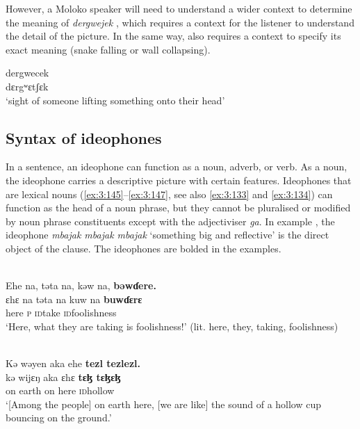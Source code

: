 However, a Moloko speaker will need to understand a wider context to determine the meaning of \textit{dergwejek} , which requires a context for the listener to understand the detail of the picture. In the same way,  also requires a context to specify its exact meaning (snake falling or wall collapsing).

\ea \label{ex:3:144}
\gll dergwecek\\
  dɛrgʷɛtʃɛk\\
\glt  ‘sight of someone lifting something onto their head’
\z

\subsection{Syntax of ideophones}\label{sec:3.6.2}
\hypertarget{RefHeading1211281525720847}{}
In a sentence, an ideophone can function as a noun, adverb, or verb. As a noun, the ideophone carries a descriptive picture with certain features.  Ideophones that are lexical nouns (\ref{ex:3:145}--\ref{ex:3:147}, see also \ref{ex:3:133} and \ref{ex:3:134}) can function as the head of a noun phrase, but they cannot be pluralised or modified by noun phrase constituents except with the adjectiviser \textit{ga}. In example , the ideophone \textit{mbajak mbajak mbajak} ‘something big and reflective’ is the direct object of the clause. The ideophones are bolded in the examples.

\ea \label{ex:3:145}\\
 Ehe na, təta na, kəw na, \textbf{bəwɗere.}\\
\gll      ɛhɛ  na      təta   na  kuw      na    \textbf{buwɗɛrɛ}\\
      here   {\PSP}    \textsc{p}    {\PSP}    \textsc{id}take   {\PSP}    \textsc{id}foolishness\\
\glt  ‘Here, what they are taking is foolishness!’ (lit. here, they, taking,  foolishness)
\z

\ea \label{ex:3:146}\\
Kə  wəyen  aka  ehe  \textbf{tezl  tezlezl.}\\
\gll  kə   wijɛŋ   aka   ɛhɛ    \textbf{tɛɮ tɛɮɛɮ}\\
      on  earth  on  here    \textsc{id}hollow\\
\glt  ‘[Among the people] on earth here, [we are like] the sound of a hollow cup bouncing on the ground.’
\z

